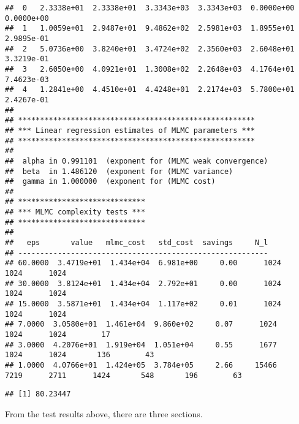 \documentclass[
]{article}
\newenvironment{Shaded}{\begin{snugshade}}{\end{snugshade}}
\newcommand{\CommentTok}[1]{\textcolor[rgb]{0.56,0.35,0.01}{\textit{#1}}}
\newcommand{\DecValTok}[1]{\textcolor[rgb]{0.00,0.00,0.81}{#1}}
\newcommand{\KeywordTok}[1]{\textcolor[rgb]{0.13,0.29,0.53}{\textbf{#1}}}
\newcommand{\NormalTok}[1]{#1}
\newcommand{\OperatorTok}[1]{\textcolor[rgb]{0.81,0.36,0.00}{\textbf{#1}}}
\newcommand{\StringTok}[1]{\textcolor[rgb]{0.31,0.60,0.02}{#1}}
\begin{document}
\begin{verbatim}
##  0   2.3338e+01  2.3338e+01  3.3343e+03  3.3343e+03  0.0000e+00  0.0000e+00 
##  1   1.0059e+01  2.9487e+01  9.4862e+02  2.5981e+03  1.8955e+01  2.9895e-01 
##  2   5.0736e+00  3.8240e+01  3.4724e+02  2.3560e+03  2.6048e+01  3.3219e-01 
##  3   2.6050e+00  4.0921e+01  1.3008e+02  2.2648e+03  4.1764e+01  7.4623e-03 
##  4   1.2841e+00  4.4510e+01  4.4248e+01  2.2174e+03  5.7800e+01  2.4267e-01 
## 
## ******************************************************
## *** Linear regression estimates of MLMC parameters ***
## ******************************************************
## 
##  alpha in 0.991101  (exponent for (MLMC weak convergence)
##  beta  in 1.486120  (exponent for (MLMC variance) 
##  gamma in 1.000000  (exponent for (MLMC cost) 
## 
## ***************************** 
## *** MLMC complexity tests *** 
## ***************************** 
## 
##   eps       value   mlmc_cost   std_cost  savings     N_l 
## --------------------------------------------------------- 
## 60.0000  3.4719e+01  1.434e+04  6.981e+00     0.00      1024      1024      1024
## 30.0000  3.8124e+01  1.434e+04  2.792e+01     0.00      1024      1024      1024
## 15.0000  3.5871e+01  1.434e+04  1.117e+02     0.01      1024      1024      1024
## 7.0000  3.0580e+01  1.461e+04  9.860e+02     0.07      1024      1024      1024        17
## 3.0000  4.2076e+01  1.919e+04  1.051e+04     0.55      1677      1024      1024       136        43
## 1.0000  4.0766e+01  1.424e+05  3.784e+05     2.66     15466      7219      2711      1424       548       196        63
\end{verbatim}

\begin{Shaded}
\end{Shaded}

\begin{verbatim}
## [1] 80.23447
\end{verbatim}

From the test results above, there are three sections.
\end{document}
